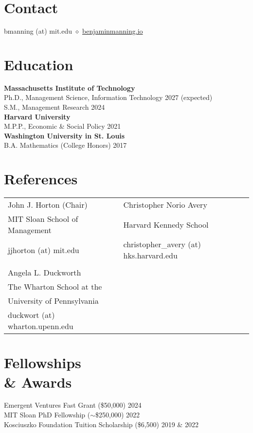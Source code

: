 \documentclass[margin,line,pifont,palatino,courier, 9pt]{res}
\begin{document}
\begin{resume}


\large


\section{\sc Contact}
bmanning (at) mit.edu $\diamond$ \href{https://benjaminmanning.io/}{benjaminmanning.io}

\section{\sc Education}
{\bf Massachusetts Institute of Technology}\\
Ph.D., Management Science, Information Technology \hfill 2027 (expected) \\
S.M., Management Research \hfill 2024\vspace{2mm}\\
{\bf Harvard University}\\
M.P.P., Economic \& Social Policy \hfill 2021\vspace{2mm}\\
{\bf Washington University in St. Louis}\\
B.A. Mathematics (College Honors) \hfill 2017

\section{\sc References}
\vspace{.15cm}
\begin{tabular}{@{}p{2.6in}p{2.75in}}
John J. Horton (Chair)& Christopher Norio Avery\\
MIT Sloan School of Management & Harvard Kennedy School \\
jjhorton (at) mit.edu & christopher\_avery (at) hks.harvard.edu\\
& \\
Angela L. Duckworth & \\
The Wharton School at the & \\
University of Pennsylvania & \\
duckwort (at) wharton.upenn.edu & \\
\end{tabular}

\section{\sc Fellowships \\ \& Awards}
Emergent Ventures Fast Grant (\$50,000) \hfill 2024 \\
MIT Sloan PhD Fellowship ($\sim$\$250,000) \hfill 2022 \\
Kosciuszko Foundation Tuition Scholarship (\$6,500) \hfill 2019 \& 2022 


\end{resume}
\end{document}

